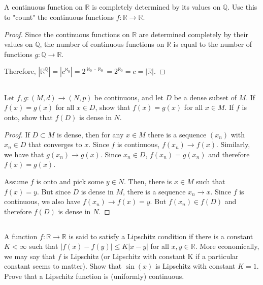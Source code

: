

\subsection{} A continuous function on $\mathbb{R}$ is completely determined by its values on $\mathbb{Q}$. Use this to "count" the continuous functions $f: \mathbb{R} \rightarrow \mathbb{R}$. 

\begin{proof}
Since the continuous functions on $\mathbb{R}$ are determined completely by their values on $\mathbb{Q}$, the number of continuous functions on $\mathbb{R}$ is equal to the number of functions $g: \mathbb{Q} \rightarrow \mathbb{R}$.

Therefore, $|\mathbb{R}^\mathbb{Q}| = |c^{\aleph_0}| = 2^{{\aleph_0}\cdot{\aleph_0}} = 2^{\aleph_0} = c = |\mathbb{R}|$.
\end{proof}


\subsection{} Let $f, g: (M, d) \rightarrow (N, p)$ be continuous, and let $D$ be a dense subset of $M$. If $f(x) = g(x)$ for all $x \in D$, show that $f(x) = g(x)$ for all $x \in M$. If $f$ is onto, show that $f(D)$ is dense in $N$.

\begin{proof}
If $D \subset M$ is dense, then for any $x \in M$ there is a sequence $(x_n)$ with $x_n \in D$ that converges to $x$. Since $f$ is continuous, $f(x_n) \rightarrow f(x)$. Similarly, we have that $g(x_n) \rightarrow g(x)$. Since $x_n \in D$, $f(x_n) = g(x_n)$ and therefore $f(x) = g(x)$. 

Assume $f$ is onto and pick some $y \in N$. Then, there is $x \in M$ such that $f(x) = y$. But since $D$ is dense in $M$, there is a sequence $x_n \rightarrow x$. Since $f$ is continuous, we also have $f(x_n) \rightarrow f(x) = y$. But $f(x_n) \in f(D)$ and therefore $f(D)$ is dense in $N$.
\end{proof}


\subsection{} A function $f: \mathbb{R} \rightarrow \mathbb{R}$ is said to satisfy a Lipschitz condition if there is a constant $K < \infty$ such that $|f(x)-f(y)| \leq K|x-y|$ for all $x,y \in \mathbb{R}$. More economically, we may say that $f$ is Lipschitz (or Lipschitz with constant K if a particular constant seems to matter).  Show that $\sin(x)$ is Lipschitz with constant $K = 1$. Prove that a Lipschitz function is (uniformly) continuous.

